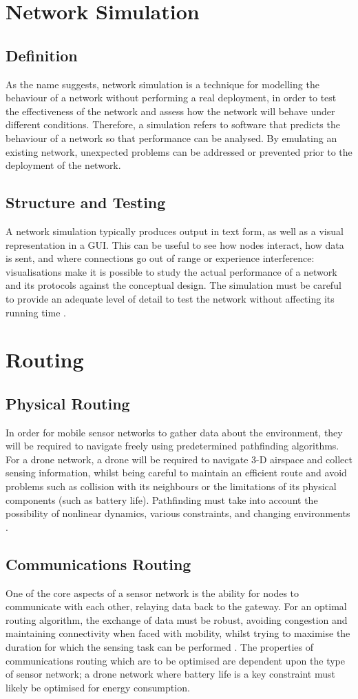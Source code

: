	\section{Network Simulation}
		\subsection{Definition}
		As the name suggests, network simulation is a technique for modelling the behaviour of a network without performing a real deployment, in order to test the effectiveness of the network and assess how the network will behave under different conditions. Therefore, a simulation refers to software that predicts the behaviour of a network so that performance can be analysed. By emulating an existing network, unexpected problems can be addressed or prevented prior to the deployment of the network.
		\subsection{Structure and Testing}
		A network simulation typically produces output in text form, as well as a visual representation in a GUI. This can be useful to see how nodes interact, how data is sent, and where connections go out of range or experience interference: visualisations make it is possible to study the actual performance of a network and its protocols against the conceptual design. The simulation must be careful to provide an adequate level of detail to test the network without affecting its running time \cite{ leebreslauetal2000}. 
	\section{Routing}
		\subsection{Physical Routing}
		In order for mobile sensor networks to gather data about the environment, they will be required to navigate freely using predetermined pathfinding algorithms. For a drone network, a drone will be required to navigate 3-D airspace and collect sensing information, whilst being careful to maintain an efficient route and avoid problems such as collision with its neighbours or the limitations of its physical components (such as battery life). Pathfinding must take into account the possibility of nonlinear dynamics, various constraints, and changing environments \cite{robertsivillietal2012}.
		\subsection{Communications Routing}
		One of the core aspects of a sensor network is the ability for nodes to communicate with each other, relaying data back to the gateway. For an optimal routing algorithm, the exchange of data must be robust, avoiding congestion and maintaining connectivity when faced with mobility, whilst trying to maximise the duration for which the sensing task can be performed \cite{ curtschurgers2010}. The properties of communications routing which are to be optimised are dependent upon the type of sensor network; a drone network where battery life is a key constraint must likely be optimised for energy consumption.